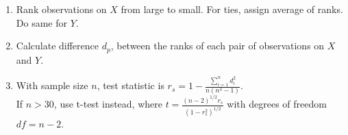 \begin{remark} 
\begin{enumerate}[label=\roman*.]
\setlength{\itemsep}{0pt}
\item  Rank observations on $X$ from large to small. For ties, assign average of ranks. Do same for $Y$.
\item Calculate difference $d_p$, between the ranks of each pair of observations on $X$ and $Y$.
\item With sample size $n$, test statistic is $r_s = 1 - \frac{\sum\limits_{i=1}^n d_i^2}{n (n^2 - 1)}$.\\
If $n>30$, use t-test instead, where $t = \frac{(n-2)^{1/2} r_s}{(1- r_s^2)^{1/2}}$ with degrees of freedom $df = n-2$.
\end{enumerate}
\end{remark}



